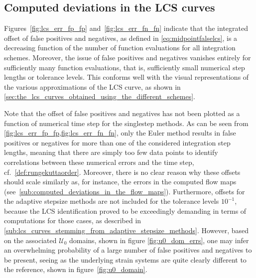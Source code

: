 \subsection{Computed deviations in the LCS curves}
\label{sub:computed_deviations_in_the_lcs_curves}

Figures~\ref{fig:lcs_err_fp_fp} and~\ref{fig:lcs_err_fn_fn} indicate that
the integrated offset of false positives and negatives, as defined in
\cref{eq:midpointfalselcs}, is a decreasing function of the number of
function evaluations for all integration schemes. Moreover, the issue of false
positives and negatives vanishes entirely for sufficiently many function
evaluations, that is, sufficiently small numerical step lengths or tolerance
levels. This conforms well with the visual representations of the various
approximations of the LCS curve, as shown in
\cref{sec:the_lcs_curves_obtained_using_the_different_schemes}.

Note that the offset of false positives and negatives has not been plotted as a
function of numerical time step for the singlestep methods. As can be seen from
\cref{fig:lcs_err_fp_fp,fig:lcs_err_fn_fn}, only the Euler method results in
false positives or negatives for more than one of the considered integration
step lengths, meaning that there are simply too few data points to identify
correlations between these numerical errors and the time step, cf.\
\cref{def:rungekuttaorder}. Moreover, there is no clear reason why these offsets
should scale similarly as, for instance, the errors in the computed flow maps
(see~\cref{sub:computed_deviations_in_the_flow_maps}).
Furthermore, offsets for the adaptive stepsize methods are not included for the
tolerance levels $10^{-1}$, because the LCS identification proved to be
exceedingly demanding in terms of computations for those cases, as described in
\cref{sub:lcs_curves_stemming_from_adaptive_stepsize_methods}. However,
based on the associated $\mathcal{U}_{0}$ domains, shown in figure
\ref{fig:u0_dom_errs}, one may infer an overwhelming probability of a large
number of false positives and negatives to be present, seeing as the underlying
strain systems are quite clearly different to the reference, shown in
figure~\ref{fig:u0_domain}.




\clearpage



